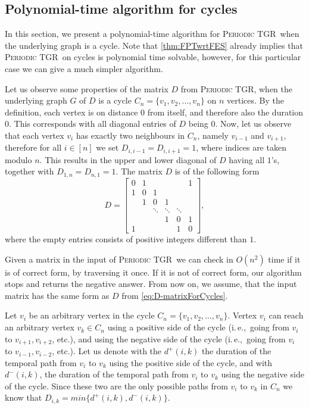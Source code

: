 \documentclass[a4paper,UKenglish,cleveref, autoref, thm-restate, anonymous]{lipics-v2021}
\newcommand{\ie}{i.\,e.,\ }
\newcommand{\deltaExact}{\textsc{Periodic TGR}}
\begin{document}
\subsection{Polynomial-time algorithm for cycles}\label{sec:cyclealgo}
In this section, we present a polynomial-time algorithm for \deltaExact\ when the underlying graph is a cycle. Note that \cref{thm:FPTwrtFES} already implies that \deltaExact\ on cycles is polynomial time solvable, however, for this particular case we can give a much simpler algorithm.


Let us observe some properties of the matrix $D$ from \deltaExact, when the underlying graph $G$ of $D$ is a cycle $C_n = \{v_1, v_2, \dots, v_n\}$  on $n$ vertices.
By the definition, each vertex is on distance $0$ from itself, and therefore also the duration $0$. This corresponds with all diagonal entries of $D$ being $0$.
Now, let us observe that each vertex $v_i$ has exactly two neighbours in $C_n$, namely $v_{i-1}$ and $v_{i+1}$,
therefore for all $i\in [n]$ we set $D_{i,i-1} = D_{i, i+1} = 1$, where indices are taken modulo $n$.
This results in the upper and lower diagonal of $D$ having all $1$'s, together with $D_{1,n} = D_{n,1} = 1$.
The matrix $D$ is of the following form
\begin{equation} \label{eq:D-matrixForCycles}
  D = 
  \begin{bmatrix}
    0 & 1 &  &  &  & 1\\
    1 & 0 & 1 &  &  & \\
    & 1 & 0 & 1 & & \\
    & & \ddots & \ddots & \ddots &   \\
    &   & &1 &  0 & 1\\ 
    1 &  &  &  &1 &  0 
  \end{bmatrix},
\end{equation}
where the empty entries consists of positive integers different than $1$.

Given a matrix in the input of \deltaExact\ we can check in $O(n^2)$ time if it is of correct form, by traversing it once. If it is not of correct form, our algorithm stops and returns the negative answer.
From now on, we assume, that the input matrix has the same form as $D$ from \cref{eq:D-matrixForCycles}.

Let $v_i$ be an arbitrary vertex in the cycle $C_n =\{v_1, v_2, \dots, v_n\}$.
Vertex $v_i$ can reach an arbitrary vertex $v_k \in C_n$ using a positive side of the cycle (\ie going from $v_i$ to $v_{i+1},  v_{i+2}$, etc.), 
and using the negative side of the cycle (\ie going from $v_i$ to $v_{i-1}, v_{i-2}$, etc.).
Let us denote with the $d^+(i,k)$ the duration of the temporal path from $v_i$ to $v_k$ using the positive side of the cycle,
and with $d^-(i,k)$, the duration of the temporal path from $v_i$ to $v_k$ using the negative side of the cycle.
Since these two are the only possible paths from $v_i$ to $v_k$ in $C_n$ we know that $D_{i,k} = min \{d^+(i,k), d^-(i,k)\}$.
\end{document}
